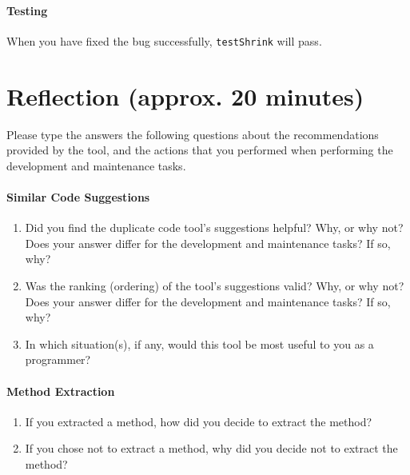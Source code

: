 \documentclass[12pt]{article}
\begin{document}
\paragraph{Testing} When you have fixed the bug successfully, \verb|testShrink| will pass.

\pagebreak

\section{Reflection (approx. 20 minutes)}

Please type the answers the following questions about the
recommendations provided by the tool, and the actions that you
performed when performing the development and maintenance tasks.

\paragraph{Similar Code Suggestions}

\begin{enumerate}
  \item Did you find the duplicate code tool's suggestions helpful?
    Why, or why not? Does your answer differ for the development and
    maintenance tasks? If so, why?
  \item Was the ranking (ordering) of the tool's suggestions valid?
    Why, or why not? Does your answer differ for the development and
    maintenance tasks? If so, why?
  \item In which situation(s), if any, would this tool be most useful
  to you as a programmer?
\end{enumerate}

\paragraph{Method Extraction}

\begin{enumerate}
  \item If you extracted a method, how did you decide to extract the
    method? 
  \item If you chose not to extract a method, why did you decide not
    to extract the method?
\end{enumerate}
\end{document}
